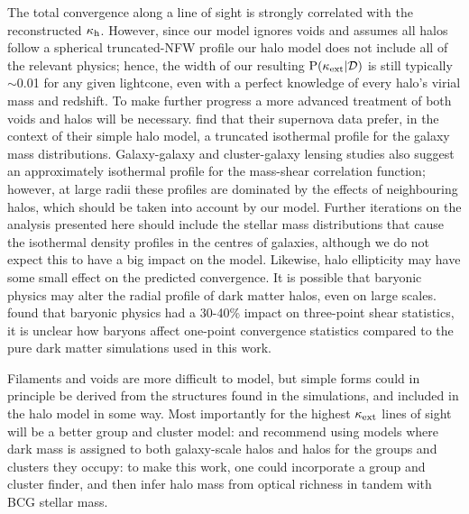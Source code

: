 \documentclass[useAMS,usenatbib,a4paper]{mn2e}
\begin{document}
The total convergence along a line of sight is strongly correlated with the
reconstructed $\kappa_{\rm h}$. However, since our model ignores voids and assumes
all halos follow a spherical truncated-NFW profile our halo model does not
include all of the relevant physics; hence, the width of our resulting
${\rm P}(\kappa_{\rm ext}|{\mathcal{D}})$ is still typically $\sim$0.01 for any given lightcone,
even with a perfect knowledge of every halo's virial mass and redshift. To
make further progress a more advanced treatment of both voids and halos will
be necessary. \citet{KarpenkaEtal2012} find that their supernova data prefer,
in the context of their simple halo model, a truncated isothermal profile for
the galaxy mass distributions. Galaxy-galaxy and cluster-galaxy  lensing
studies \citep[\eg][]{GavazziEtal2007,JohnstonEtal2007} also suggest an
approximately isothermal profile for the mass-shear correlation function;
however, at large radii these profiles are dominated by the effects of
neighbouring halos, which should be taken into account by our model. Further
iterations on the analysis presented here should include the stellar mass
distributions that cause the isothermal density profiles in the centres of
galaxies, although we do not expect this to have a big impact on the model.
Likewise,  halo ellipticity may have some small effect on the predicted
convergence. It is possible that baryonic physics may alter   
the radial profile of dark matter halos, even on large scales. \citet{Semboloni+2012}
found that baryonic physics had a 30-40\% impact on three-point shear statistics, it is
unclear how baryons affect one-point convergence statistics compared to the pure dark matter
simulations used in this work.

Filaments and voids are more difficult to model, but simple forms could in
principle be derived from the structures found in the simulations, and
included in the halo model in some way. Most importantly for the highest
$\kappa_{\rm ext}$ lines of sight will be a better group and cluster model:
\citet{MomchevaEtal2006} and  \citet{WongEtal2011} recommend using models
where dark mass is assigned to both galaxy-scale halos and halos for the
groups and clusters they occupy: to make this work, one could incorporate a
group and cluster finder, and then infer halo mass from optical richness
\citep[\eg][]{MaxBCG} in tandem with BCG stellar mass.
\end{document}
